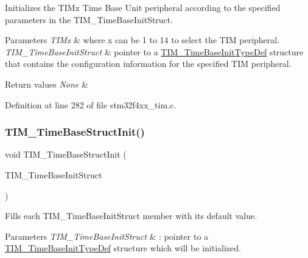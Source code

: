 Initializes the T\+I\+Mx Time Base Unit peripheral according to the specified parameters in the T\+I\+M\+\_\+\+Time\+Base\+Init\+Struct. 


\begin{DoxyParams}{Parameters}
{\em T\+I\+Mx} & where x can be 1 to 14 to select the T\+IM peripheral. \\
\hline
{\em T\+I\+M\+\_\+\+Time\+Base\+Init\+Struct} & pointer to a \hyperlink{struct_t_i_m___time_base_init_type_def}{T\+I\+M\+\_\+\+Time\+Base\+Init\+Type\+Def} structure that contains the configuration information for the specified T\+IM peripheral. \\
\hline
\end{DoxyParams}

\begin{DoxyRetVals}{Return values}
{\em None} & \\
\hline
\end{DoxyRetVals}


Definition at line 282 of file stm32f4xx\+\_\+tim.\+c.

\mbox{\label{group___t_i_m_ga1556a0b9a5d53506875fd7de0cbc6b1f}} 
\subsubsection{\texorpdfstring{T\+I\+M\+\_\+\+Time\+Base\+Struct\+Init()}{TIM\_TimeBaseStructInit()}}
{\footnotesize\ttfamily void T\+I\+M\+\_\+\+Time\+Base\+Struct\+Init (\begin{DoxyParamCaption}\item[{\hyperlink{struct_t_i_m___time_base_init_type_def}{T\+I\+M\+\_\+\+Time\+Base\+Init\+Type\+Def} $\ast$}]{T\+I\+M\+\_\+\+Time\+Base\+Init\+Struct }\end{DoxyParamCaption})}



Fills each T\+I\+M\+\_\+\+Time\+Base\+Init\+Struct member with its default value. 


\begin{DoxyParams}{Parameters}
{\em T\+I\+M\+\_\+\+Time\+Base\+Init\+Struct} & \+: pointer to a \hyperlink{struct_t_i_m___time_base_init_type_def}{T\+I\+M\+\_\+\+Time\+Base\+Init\+Type\+Def} structure which will be initialized. \\
\hline
\end{DoxyParams}

